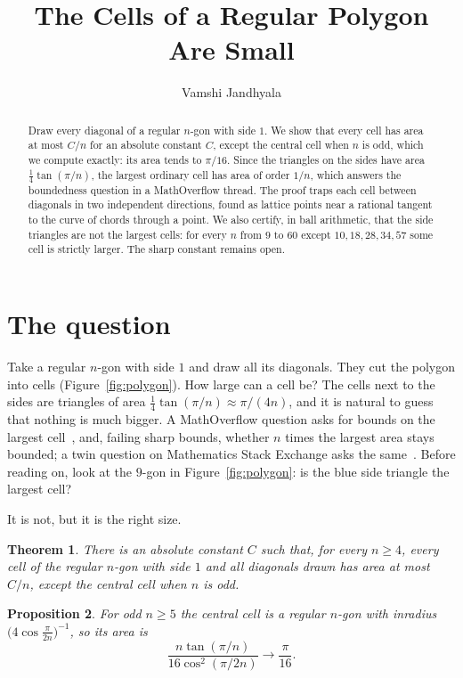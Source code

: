 \documentclass[11pt]{amsart}
\title{The Cells of a Regular Polygon Are Small}
\author{Vamshi Jandhyala}
\newtheorem{theorem}{Theorem}
\newtheorem{proposition}[theorem]{Proposition}
\theoremstyle{remark}
\begin{document}
\begin{abstract}
Draw every diagonal of a regular $n$-gon with side $1$. We show that every cell has area at most $C/n$ for an absolute constant $C$, except the central cell when $n$ is odd, which we compute exactly: its area tends to $\pi/16$. Since the triangles on the sides have area $\frac14\tan(\pi/n)$, the largest ordinary cell has area of order $1/n$, which answers the boundedness question in a MathOverflow thread. The proof traps each cell between diagonals in two independent directions, found as lattice points near a rational tangent to the curve of chords through a point. We also certify, in ball arithmetic, that the side triangles are not the largest cells: for every $n$ from $9$ to $60$ except $10,18,28,34,57$ some cell is strictly larger. The sharp constant remains open.
\end{abstract}

\maketitle

\section{The question}

Take a regular $n$-gon with side $1$ and draw all its diagonals. They cut the polygon into cells (Figure~\ref{fig:polygon}). How large can a cell be? The cells next to the sides are triangles of area $\frac14\tan(\pi/n)\approx\pi/(4n)$, and it is natural to guess that nothing is much bigger. A MathOverflow question asks for bounds on the largest cell~\cite{MO}, and, failing sharp bounds, whether $n$ times the largest area stays bounded; a twin question on Mathematics Stack Exchange asks the same~\cite{MSE}. Before reading on, look at the $9$-gon in Figure~\ref{fig:polygon}: is the blue side triangle the largest cell?

It is not, but it is the right size.

\begin{theorem}\label{thm:main}
There is an absolute constant $C$ such that, for every $n\ge4$, every cell of the regular $n$-gon with side $1$ and all diagonals drawn has area at most $C/n$, except the central cell when $n$ is odd.
\end{theorem}

\begin{proposition}\label{prop:central}
For odd $n\ge5$ the central cell is a regular $n$-gon with inradius $\bigl(4\cos\frac{\pi}{2n}\bigr)^{-1}$, so its area is
\[
\frac{n\tan(\pi/n)}{16\cos^2(\pi/2n)}\longrightarrow\frac{\pi}{16}.
\]
\end{proposition}
\end{document}
